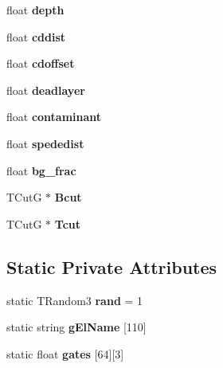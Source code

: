 \begin{DoxyCompactItemize}
\item 
\hypertarget{classdoppler_ac238412e666b74f8e087841d74ba29d9}{float {\bfseries depth}}\label{classdoppler_ac238412e666b74f8e087841d74ba29d9}

\item 
\hypertarget{classdoppler_ab7b2d87bd7a05a73cc01c26d76e8cd93}{float {\bfseries cddist}}\label{classdoppler_ab7b2d87bd7a05a73cc01c26d76e8cd93}

\item 
\hypertarget{classdoppler_ade25af8752bc9c54cfb04a1c444f2be6}{float {\bfseries cdoffset}}\label{classdoppler_ade25af8752bc9c54cfb04a1c444f2be6}

\item 
\hypertarget{classdoppler_a09bc0cdb38a83eaa1e9d1d3e34c6e5cc}{float {\bfseries deadlayer}}\label{classdoppler_a09bc0cdb38a83eaa1e9d1d3e34c6e5cc}

\item 
\hypertarget{classdoppler_a9f50aca8788087aec33b5bbc17fcb136}{float {\bfseries contaminant}}\label{classdoppler_a9f50aca8788087aec33b5bbc17fcb136}

\item 
\hypertarget{classdoppler_a977ce490a70aa7f4db76a6e2315ca21c}{float {\bfseries spededist}}\label{classdoppler_a977ce490a70aa7f4db76a6e2315ca21c}

\item 
\hypertarget{classdoppler_af3b8c866c2e7ede2d32769cbc758fa9d}{float {\bfseries bg\-\_\-frac}}\label{classdoppler_af3b8c866c2e7ede2d32769cbc758fa9d}

\item 
\hypertarget{classdoppler_ab9f46453da5b30a682c8858a5bb384e5}{T\-Cut\-G $\ast$ {\bfseries Bcut}}\label{classdoppler_ab9f46453da5b30a682c8858a5bb384e5}

\item 
\hypertarget{classdoppler_a6c9da779ddf01933a0c9c75a48abc865}{T\-Cut\-G $\ast$ {\bfseries Tcut}}\label{classdoppler_a6c9da779ddf01933a0c9c75a48abc865}

\end{DoxyCompactItemize}
\subsection*{Static Private Attributes}
\begin{DoxyCompactItemize}
\item 
\hypertarget{classdoppler_aae9abccd585d661865d248898d74bbd2}{static T\-Random3 {\bfseries rand} = 1}\label{classdoppler_aae9abccd585d661865d248898d74bbd2}

\item 
\hypertarget{classdoppler_a952dcea91ca4181a84b76d65ba20457d}{static string {\bfseries g\-El\-Name} \mbox{[}110\mbox{]}}\label{classdoppler_a952dcea91ca4181a84b76d65ba20457d}

\item 
\hypertarget{classdoppler_a079fe638004583658e9d1ca6f5b92fc1}{static float {\bfseries gates} \mbox{[}64\mbox{]}\mbox{[}3\mbox{]}}\label{classdoppler_a079fe638004583658e9d1ca6f5b92fc1}

\end{DoxyCompactItemize}



